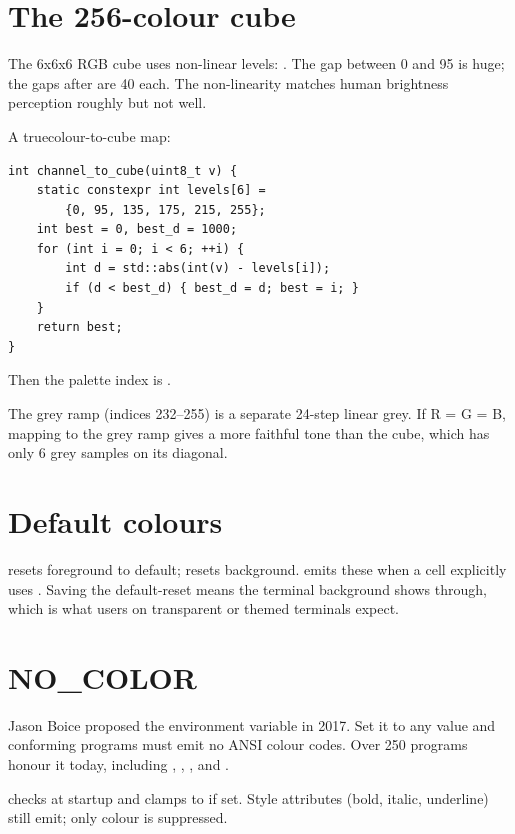 \section{The 256-colour cube}

The 6x6x6 RGB cube uses non-linear levels:
. The gap between 0 and 95 is
huge; the gaps after are 40 each. The non-linearity matches human
brightness perception roughly but not well.

A truecolour-to-cube map:

\begin{lstlisting}
int channel_to_cube(uint8_t v) {
    static constexpr int levels[6] =
        {0, 95, 135, 175, 215, 255};
    int best = 0, best_d = 1000;
    for (int i = 0; i < 6; ++i) {
        int d = std::abs(int(v) - levels[i]);
        if (d < best_d) { best_d = d; best = i; }
    }
    return best;
}
\end{lstlisting}

Then the palette index is .

The grey ramp (indices 232--255) is a separate 24-step linear
grey. If R = G = B, mapping to the grey ramp gives a more
faithful tone than the cube, which has only 6 grey samples on
its diagonal.

\section{Default colours}

\code{ESC [ 39 m} resets foreground to default;  resets
background. \maya{} emits these when a cell explicitly uses
. Saving the default-reset means the
terminal background shows through, which is what users on
transparent or themed terminals expect.

\section{NO\_COLOR}

\begin{funfact}
Jason Boice proposed the  environment variable
in 2017. Set it to any value and conforming programs must emit
no ANSI colour codes. Over 250 programs honour it today,
including , , , and \maya{}.
\end{funfact}

\maya{} checks  at startup and clamps to
 if set. Style attributes (bold, italic,
underline) still emit; only colour is suppressed.

